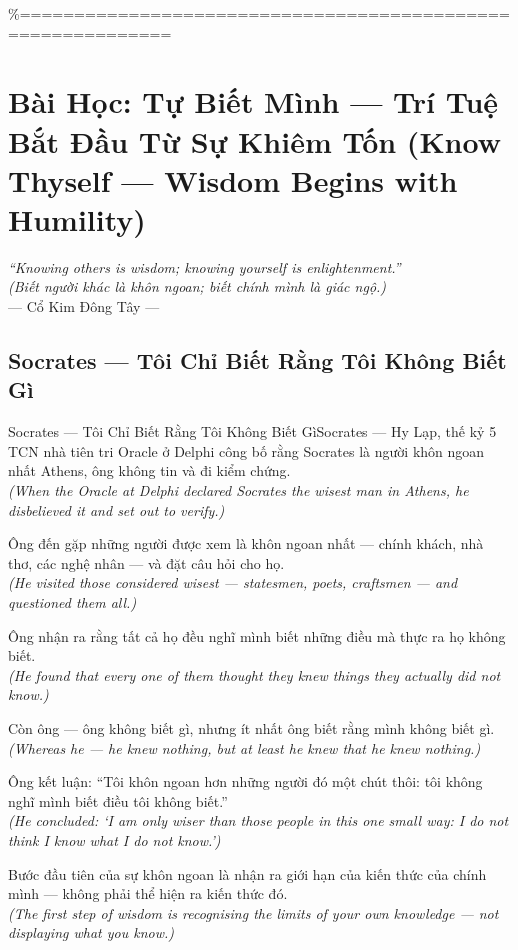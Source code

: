 \%============================================================
\chapter{Bài Học: Tự Biết Mình --- Trí Tuệ Bắt Đầu Từ Sự Khiêm Tốn (Know Thyself --- Wisdom Begins with Humility)}
\begin{center}
  \textit{\color{truyengold}``Knowing others is wisdom; knowing yourself is enlightenment.''}\\[4pt]
  \textit{(Biết người khác là khôn ngoan; biết chính mình là giác ngộ.)}\\[4pt]
  \small\color{truyenblue}--- Cổ Kim Đông Tây ---
\end{center}
\ngancach

\section{Socrates --- Tôi Chỉ Biết Rằng Tôi Không Biết Gì}
\begin{truyen}{Socrates --- Tôi Chỉ Biết Rằng Tôi Không Biết Gì}{Socrates --- Hy Lạp, thế kỷ 5 TCN}
 nhà tiên tri Oracle ở Delphi công bố rằng Socrates là người khôn ngoan nhất Athens, ông không tin và đi kiểm chứng.\\[4pt]
\textit{(When the Oracle at Delphi declared Socrates the wisest man in Athens, he disbelieved it and set out to verify.)}

Ông đến gặp những người được xem là khôn ngoan nhất --- chính khách, nhà thơ, các nghệ nhân --- và đặt câu hỏi cho họ.\\[4pt]
\textit{(He visited those considered wisest --- statesmen, poets, craftsmen --- and questioned them all.)}

Ông nhận ra rằng tất cả họ đều nghĩ mình biết những điều mà thực ra họ không biết.\\[4pt]
\textit{(He found that every one of them thought they knew things they actually did not know.)}

Còn ông --- ông không biết gì, nhưng ít nhất ông biết rằng mình không biết gì.\\[4pt]
\textit{(Whereas he --- he knew nothing, but at least he knew that he knew nothing.)}

Ông kết luận: ``Tôi khôn ngoan hơn những người đó một chút thôi: tôi không nghĩ mình biết điều tôi không biết.''\\[4pt]
\textit{(He concluded: `I am only wiser than those people in this one small way: I do not think I know what I do not know.')}

\end{truyen}
\begin{baihoc}
  Bước đầu tiên của sự khôn ngoan là nhận ra giới hạn của kiến thức của chính mình --- không phải thể hiện ra kiến thức đó.\\[4pt]
  \textit{(The first step of wisdom is recognising the limits of your own knowledge --- not displaying what you know.)}
\end{baihoc}

